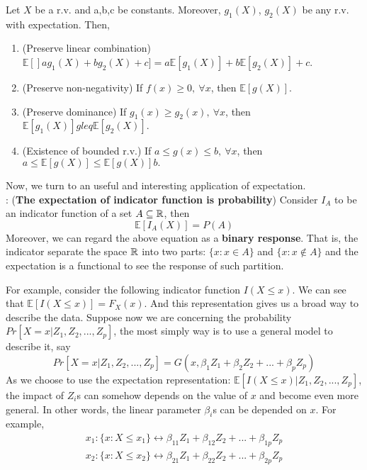 \documentclass[11pt]{article}
\begin{document}
\begin{property}
	Let $X$ be a r.v. and a,b,c be constants. Moreover, $g_1(X)$, $g_2(X)$ be any r.v. with expectation. Then,
	\begin{enumerate}
		\item (Preserve linear combination) $\mathbb{E}[]ag_1(X)+bg_2(X)+c]=a\mathbb{E}[g_1(X)] + b\mathbb{E}[g_2(X)] + c$.
		\item (Preserve non-negativity) If $f(x)\geq0,\ \forall x$, then $\mathbb{E}[g(X)]$.
		\item (Preserve dominance) If $g_1(x)\geq g_2(x),\ \forall x$, then $\mathbb{E}[g_1(X)]gleq\mathbb{E}[g_2(X)].$
		\item (Existence of bounded r.v.) If $a\leq g(x) \leq b,\ \forall x$, then $a\leq \mathbb{E}[g(X)]\leq\mathbb{E}[g(X)] b.$
	\end{enumerate}
\end{property}

Now, we turn to an useful and interesting application of expectation.\\

: ({\bf The expectation of indicator function is probability})
Consider $I_A$ to be an indicator function of a set $A\subseteq{\mathbb R}$, then
$$\mathbb{E}[I_A(X)] = P(A)$$
Moreover, we can regard the above equation as a {\bf binary response}. That is, the indicator separate the space ${\mathbb R}$ into two parts: $\{x:x\in A\}$ and $\{x:x\notin A \}$ and the expectation is a functional to see the response of such partition.

For example, consider the following indicator function $I(X\leq x)$. We can see that $\mathbb{E}[I(X\leq x)] = F_X(x)$. And this representation gives us a broad way to describe the data. Suppose now we are concerning the probability $Pr[X=x|Z_1,Z_2,...,Z_p]$, the most simply way is to use a general model to describe it, say
$$Pr[X=x|Z_1,Z_2,...,Z_p] = G(x,\beta_1Z_1+\beta_2Z_2+...+\beta_pZ_p)$$
As we choose to use the expectation representation: $\mathbb{E}[I(X\leq x)|Z_1,Z_2,...,Z_p]$, the impact of $Z_i$s can somehow depends on the value of $x$ and become even more general. In other words, the linear parameter $\beta_i$s can be depended on $x$. For example,
\begin{align*}
x_1: \{x:X\leq x_1 \}\leftrightarrow \beta_{11}Z_1+\beta_{12}Z_2+...+\beta_{1p}Z_p\\
x_2: \{x:X\leq x_2 \}\leftrightarrow \beta_{21}Z_1+\beta_{22}Z_2+...+\beta_{2p}Z_p
\end{align*}
\end{document}
